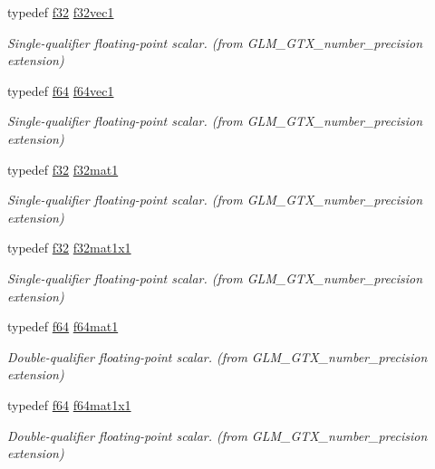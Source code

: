 \begin{DoxyCompactItemize}
typedef \mbox{\hyperlink{group__gtc__type__precision_ga0ec999b57f5330d9021256e96038df04}{f32}} \mbox{\hyperlink{group__gtx__number__precision_gadab8e598b0b4697629482682bdb7f223}{f32vec1}}
\begin{DoxyCompactList}\small\item\em Single-\/qualifier floating-\/point scalar. (from G\+L\+M\+\_\+\+G\+T\+X\+\_\+number\+\_\+precision extension) \end{DoxyCompactList}\item 
typedef \mbox{\hyperlink{group__gtc__type__precision_ga2bba392e555124b36cde6abba349bab3}{f64}} \mbox{\hyperlink{group__gtx__number__precision_ga44336a26c958d66efdfb5a6c114c538e}{f64vec1}}
\begin{DoxyCompactList}\small\item\em Single-\/qualifier floating-\/point scalar. (from G\+L\+M\+\_\+\+G\+T\+X\+\_\+number\+\_\+precision extension) \end{DoxyCompactList}\item 
typedef \mbox{\hyperlink{group__gtc__type__precision_ga0ec999b57f5330d9021256e96038df04}{f32}} \mbox{\hyperlink{group__gtx__number__precision_gae5ff376ec910c360f06acc0c2b99260c}{f32mat1}}
\begin{DoxyCompactList}\small\item\em Single-\/qualifier floating-\/point scalar. (from G\+L\+M\+\_\+\+G\+T\+X\+\_\+number\+\_\+precision extension) \end{DoxyCompactList}\item 
typedef \mbox{\hyperlink{group__gtc__type__precision_ga0ec999b57f5330d9021256e96038df04}{f32}} \mbox{\hyperlink{group__gtx__number__precision_ga01caec78388a82a9a22bd45e5751a38a}{f32mat1x1}}
\begin{DoxyCompactList}\small\item\em Single-\/qualifier floating-\/point scalar. (from G\+L\+M\+\_\+\+G\+T\+X\+\_\+number\+\_\+precision extension) \end{DoxyCompactList}\item 
typedef \mbox{\hyperlink{group__gtc__type__precision_ga2bba392e555124b36cde6abba349bab3}{f64}} \mbox{\hyperlink{group__gtx__number__precision_ga23f8f53c78b50aa07a113c3d07d01bc9}{f64mat1}}
\begin{DoxyCompactList}\small\item\em Double-\/qualifier floating-\/point scalar. (from G\+L\+M\+\_\+\+G\+T\+X\+\_\+number\+\_\+precision extension) \end{DoxyCompactList}\item 
typedef \mbox{\hyperlink{group__gtc__type__precision_ga2bba392e555124b36cde6abba349bab3}{f64}} \mbox{\hyperlink{group__gtx__number__precision_ga710a5952d78b22635c71c5fc2c0a3319}{f64mat1x1}}
\begin{DoxyCompactList}\small\item\em Double-\/qualifier floating-\/point scalar. (from G\+L\+M\+\_\+\+G\+T\+X\+\_\+number\+\_\+precision extension) \end{DoxyCompactList}\end{DoxyCompactItemize}
